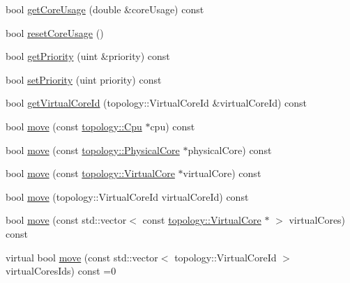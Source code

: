 \begin{DoxyCompactItemize}
\item 
bool \hyperlink{classmammut_1_1task_1_1ExecutionUnitLinux_abe366c28b491cda5a42bdc4e76f81273}{get\-Core\-Usage} (double \&core\-Usage) const 
\item 
bool \hyperlink{classmammut_1_1task_1_1ExecutionUnitLinux_a76f3d5ca16cb375e1cd05dcdb580d569}{reset\-Core\-Usage} ()
\item 
bool \hyperlink{classmammut_1_1task_1_1ExecutionUnitLinux_a0c8d351bedcfc82687e2b2c4d7aa3dc3}{get\-Priority} (uint \&priority) const 
\item 
bool \hyperlink{classmammut_1_1task_1_1ExecutionUnitLinux_a10d3890a25520a48de695607730dc297}{set\-Priority} (uint priority) const 
\item 
bool \hyperlink{classmammut_1_1task_1_1ExecutionUnitLinux_ab527ddf71052131babc698c9a7256d3a}{get\-Virtual\-Core\-Id} (topology\-::\-Virtual\-Core\-Id \&virtual\-Core\-Id) const 
\item 
bool \hyperlink{classmammut_1_1task_1_1ExecutionUnitLinux_ab7585761d96e16b2602f9344dacf58a6}{move} (const \hyperlink{classmammut_1_1topology_1_1Cpu}{topology\-::\-Cpu} $\ast$cpu) const 
\item 
bool \hyperlink{classmammut_1_1task_1_1ExecutionUnitLinux_a56288270558b2d8b802e84a8027c3299}{move} (const \hyperlink{classmammut_1_1topology_1_1PhysicalCore}{topology\-::\-Physical\-Core} $\ast$physical\-Core) const 
\item 
bool \hyperlink{classmammut_1_1task_1_1ExecutionUnitLinux_ae948a78fd35c7a6adb83aecf0bb80dab}{move} (const \hyperlink{classmammut_1_1topology_1_1VirtualCore}{topology\-::\-Virtual\-Core} $\ast$virtual\-Core) const 
\item 
bool \hyperlink{classmammut_1_1task_1_1ExecutionUnitLinux_a18bc2f740db5dc7daa7b3750d7f3e3cc}{move} (topology\-::\-Virtual\-Core\-Id virtual\-Core\-Id) const 
\item 
bool \hyperlink{classmammut_1_1task_1_1ExecutionUnitLinux_ab0785f5d6e7fc7dca4c66ccc7871b5d5}{move} (const std\-::vector$<$ const \hyperlink{classmammut_1_1topology_1_1VirtualCore}{topology\-::\-Virtual\-Core} $\ast$ $>$ virtual\-Cores) const 
\item 
virtual bool \hyperlink{classmammut_1_1task_1_1ExecutionUnitLinux_aedac673e0c581fcbfc6b3fb5a38cd81b}{move} (const std\-::vector$<$ topology\-::\-Virtual\-Core\-Id $>$ virtual\-Cores\-Ids) const =0
\end{DoxyCompactItemize}


